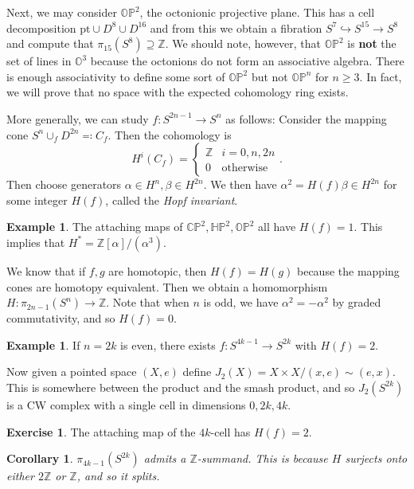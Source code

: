 \documentclass[leqno, openany]{memoir}
\newtheorem{cor}[thm]{Corollary}
\theoremstyle{definition}
\newtheorem{exm}[thm]{Example}
\newtheorem{exer}[thm]{Exercise}
\theoremstyle{remark}
\theoremstyle{plain}
\theoremstyle{definition}
\theoremstyle{remark}
\renewcommand{\H}{\mathbb{H}}
\newcommand{\C}{\mathbb{C}}
\newcommand{\Z}{\mathbb{Z}}
\renewcommand{\P}{\mathbb{P}}
\newcommand{\mr}[1]{\mathrm{#1}}
\begin{document}
Next, we may consider $\mathbb{O}\P^2$, the octonionic projective plane. This has a cell decomposition $\mr{pt} \cup D^8 \cup D^{16}$ and from this we obtain a fibration $S^7 \hookrightarrow S^{15} \to S^8$ and compute that $\pi_{15}(S^8) \supseteq \Z$. We should note, however, that $\mathbb{O}\P^2$ is \textbf{not} the set of lines in $\mathbb{O}^3$ because the octonions do not form an associative algebra. There is enough associativity to define some sort of $\mathbb{O}\P^2$ but not $\mathbb{O}\P^n$ for $n \geq 3$. In fact, we will prove that no space with the expected cohomology ring exists.

More generally, we can study $f \colon S^{2n-1} \to S^n$ as follows: Consider the mapping cone $S^n \cup_f D^{2n} \eqqcolon C_f$. Then the cohomology is
\[ H^i(C_f) = \begin{cases}
    \Z & i = 0, n, 2n \\
    0 & \text{otherwise}
\end{cases}. \]
Then choose generators $\alpha \in H^n, \beta \in H^{2n}$. We then have $\alpha^2 = H(f) \beta \in H^{2n}$ for some integer $H(f)$, called the \textit{Hopf invariant}.

\begin{exm}
    The attaching maps of $\C\P^2, \H\P^2, \mathbb{O}\P^2$ all have $H(f) = 1$. This implies that $H^* = \Z[\alpha]/(\alpha^3)$.
\end{exm}

We know that if $f,g$ are homotopic, then $H(f) = H(g)$ because the mapping cones are homotopy equivalent. Then we obtain a homomorphism $H \colon \pi_{2n-1}(S^n) \to \Z$. Note that when $n$ is odd, we have $\alpha^2 = -\alpha^2$ by graded commutativity, and so $H(f) = 0$.

\begin{exm}
    If $n = 2k$ is even, there exists $f \colon S^{4k-1} \to S^{2k}$ with $H(f) = 2$.
\end{exm}

Now given a pointed space $(X,e)$ define $J_2(X) = X \times X / (x,e) \sim (e,x)$. This is somewhere between the product and the smash product, and so $J_2(S^{2k})$ is a CW complex with a single cell in dimensions $0, 2k, 4k$.

\begin{exer}
    The attaching map of the $4k$-cell has $H(f) = 2$.
\end{exer}

\begin{cor}
    $\pi_{4k-1}(S^{2k})$ admits a $\Z$-summand. This is because $H$ surjects onto either $2\Z$ or $\Z$, and so it splits.
\end{cor}
\end{document}
